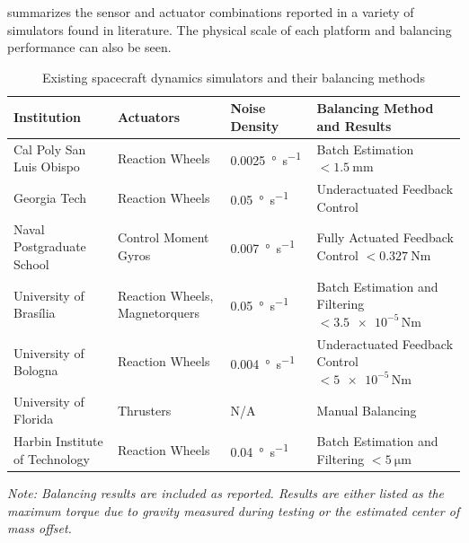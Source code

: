  summarizes the sensor and actuator combinations reported in a variety of simulators found in literature. The physical scale of each platform and balancing performance can also be seen. 

\begin{table}[!ht]
\caption{Existing spacecraft dynamics simulators and their balancing methods}\label{table:existing_testbeds}
\centering
\renewcommand{\arraystretch}{1.3}

\begin{tabularx}{\textwidth}{
    >{\raggedright\arraybackslash}p{3cm}   %
    >{\raggedright\arraybackslash}p{3.5cm} %
    >{\raggedright\arraybackslash}p{2.2cm} %
    >{\raggedright\arraybackslash}X}       %
\toprule
\textbf{Institution} & \textbf{Actuators} & \textbf{Noise Density} & \textbf{Balancing Method and Results} \\
\midrule
Cal Poly San Luis Obispo~\cite{dam_applied_2014} & 
Reaction Wheels & 
\SI{0.0025}{\degree\per\second} & 
Batch Estimation \newline $<\SI{1.5}{\milli\metre}$ \\
\addlinespace[0.75em]

Georgia Tech~\cite{choi_automatic_2016} & 
Reaction Wheels & 
\SI{0.05}{\degree\per\second} & 
Underactuated Feedback Control \\
\addlinespace[0.75em]
Naval Postgraduate School~\cite{kim_system_2006} & 
Control Moment Gyros & 
\SI{0.007}{\degree\per\second} & 
Fully Actuated Feedback Control \newline $<\SI{0.327}{\newton\metre}$ \\
\addlinespace[0.75em]
University of Brasília~\cite{silva_filtering_2018} & 
Reaction Wheels, Magnetorquers & 
\SI{0.05}{\degree\per\second} & 
Batch Estimation and Filtering \newline $<\num{3.5e-5}\,\si{\newton\metre}$ \\
\addlinespace[0.75em]
University of Bologna~\cite{modenini2020dynamic} & 
Reaction Wheels & 
\SI{0.004}{\degree\per\second} & 
Underactuated Feedback Control \newline $<\num{5e-5}\,\si{\newton\metre}$ \\
\addlinespace[0.75em]
University of Florida~\cite{saulnier2014six} & 
Thrusters & 
N/A & 
Manual Balancing \\
\addlinespace[0.75em]
Harbin Institute of Technology~\cite{xu_parameter_2015} & 
Reaction Wheels & 
\SI{0.04}{\degree\per\second} & 
Batch Estimation and Filtering \newline $<\SI{5}{\micro\metre}$ \\


\bottomrule
\end{tabularx}

\vspace{0.5em}
\raggedright\footnotesize
\textit{Note: Balancing results are included as reported. Results are either listed as the maximum torque due to gravity measured during testing or the estimated center of mass offset.}
\end{table}

